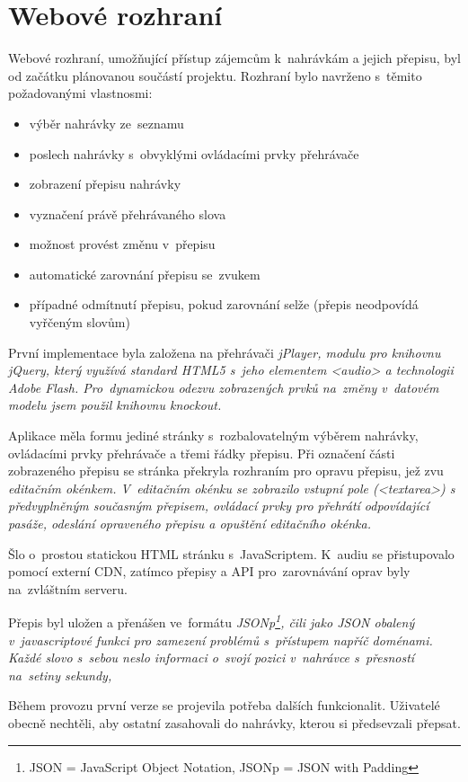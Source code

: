 \chapter{Webové rozhraní}
\label{kap:webove-rozhrani}

Webové rozhraní, umožňující přístup zájemcům k~nahrávkám a jejich přepisu, byl
od začátku plánovanou součástí projektu. Rozhraní bylo navrženo s~těmito
požadovanými vlastnosmi:

\begin{itemize}
\item{výběr nahrávky ze~seznamu}
\item{poslech nahrávky s~obvyklými ovládacími prvky přehrávače}
\item{zobrazení přepisu nahrávky}
\item{vyznačení právě přehrávaného slova}
\item{možnost provést změnu v~přepisu}
\item{automatické zarovnání přepisu se~zvukem}
\item{případné odmítnutí přepisu, pokud zarovnání selže (přepis neodpovídá
vyřčeným slovům)}
\end{itemize}

První implementace byla založena na přehrávači
\em{jPlayer}, modulu pro knihovnu \em{jQuery}, který využívá standard HTML5
s~jeho elementem \em{<audio>} a technologii \em{Adobe Flash}. Pro~dynamickou
odezvu zobrazených prvků na~změny v~datovém modelu jsem použil knihovnu
\em{knockout}.

Aplikace měla formu jediné stránky s~rozbalovatelným výběrem nahrávky,
ovládacími prvky přehrávače a třemi řádky přepisu. Při označení části
zobrazeného přepisu se stránka překryla rozhraním pro opravu přepisu, jež zvu
\em{editačním okénkem}. V~editačním okénku se zobrazilo vstupní pole
(\em{<textarea>}) s předvyplněným současným přepisem, ovládací prvky pro
přehrátí odpovídající pasáže, odeslání opraveného přepisu a opuštění editačního
okénka.

Šlo o~prostou statickou HTML stránku s~JavaScriptem. K~audiu se přistupovalo
pomocí externí CDN, zatímco přepisy a API pro~zarovnávání oprav byly
na~zvláštním serveru.

Přepis byl uložen a přenášen ve~formátu \em{JSONp}\footnote{JSON = JavaScript
Object Notation, JSONp = JSON with Padding}, čili jako \em{JSON} obalený
v~javascriptové funkci pro zamezení problémů s~přístupem napříč doménami. Každé
slovo s~sebou neslo informaci o~svojí pozici v~nahrávce s~přesností na~setiny
sekundy, 

Během provozu první verze se projevila potřeba dalších funkcionalit. Uživatelé
obecně nechtěli, aby ostatní zasahovali do nahrávky, kterou si předsevzali
přepsat. 
